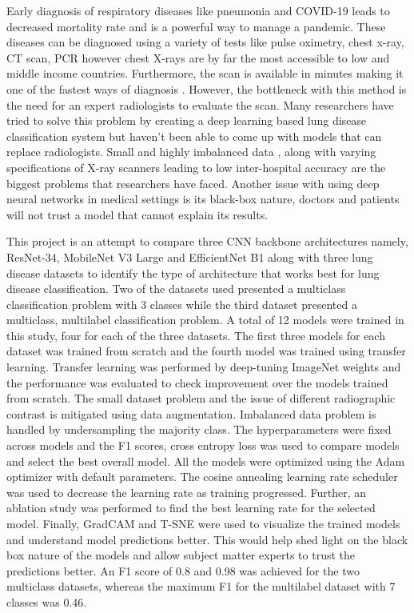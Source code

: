\documentclass[10pt,twocolumn,letterpaper]{article}
\begin{document}
Early diagnosis of respiratory diseases like pneumonia and COVID-19 leads to decreased mortality 
rate \cite{daniel2016time} and is a powerful way to manage a pandemic\cite{xu2020facile}. 
These diseases can be diagnosed using a variety of tests like pulse oximetry, chest x-ray, 
CT scan\cite{mattsmith2022},  PCR\cite{akhtar1996pcr} however chest X-rays are by far the most 
accessible\cite{frija2021improve} to low and middle income countries. 
Furthermore, the scan is available in minutes making it one of the fastest ways of diagnosis
\cite{healthwise2021}. However, the bottleneck with this method 
is the need for an expert radiologists to evaluate the scan\cite{mehrotra2009radiologists}. 
Many researchers have tried to solve this problem by creating a deep learning based
lung disease classification system \cite{wang2021deep} but 
haven't been able to come up with models that can replace radiologists. Small 
\cite{guefrechi2021deep} and highly imbalanced data \cite{wang2021deep}, along with varying 
specifications of X-ray scanners leading to low inter-hospital accuracy \cite{melissarohman2018}
are the biggest problems that 
researchers have faced. Another issue with using deep neural networks in medical settings is 
its black-box nature, doctors and patients will not trust a model that 
cannot explain its results\cite{aleksandra2019}. 

This project is an attempt to compare three CNN backbone architectures namely, ResNet-34, 
MobileNet V3 Large and EfficientNet B1 along with three lung disease datasets 
to identify the type of architecture that works best for lung disease classification. Two 
of the datasets used presented a multiclass classification problem with 3 classes while 
the third dataset presented a multiclass, multilabel classification problem. A total 
of 12 models were trained in this study, four for each of the three datasets. The first 
three models for each dataset was trained from scratch and the fourth model was trained 
using transfer learning. Transfer learning was performed by deep-tuning ImageNet
weights and the performance was evaluated to check improvement over the models trained from scratch. 
The small dataset problem and the issue of different radiographic contrast \cite{andrew2022rad} 
is mitigated using data augmentation. Imbalanced data problem is handled by undersampling the 
majority class. The hyperparameters were fixed across models and the F1 scores, cross entropy loss 
was used to compare models and select the best overall model. All the models were optimized using 
the Adam optimizer \cite{kingma2014adam} with default parameters. The cosine annealing \cite{loshchilov2016sgdr} 
learning rate scheduler was used to decrease the learning rate as training progressed.
Further, an ablation study was performed to find the best learning rate for the selected model.
Finally, GradCAM \cite{jacobgilpytorchcam} and T-SNE were used to visualize the trained models and understand 
model predictions better. This would help shed light on the black box nature of the models 
and allow subject matter experts to trust the predictions better. 
An F1 score of 0.8 and 0.98 was achieved for the two multiclass
datasets, whereas the maximum F1 for the multilabel dataset with 7 classes was 0.46.
\end{document}
